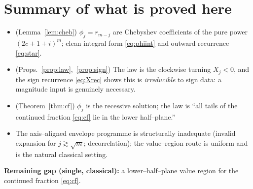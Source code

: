 \documentclass[11pt]{article}
\theoremstyle{definition}
\begin{document}
\section*{Summary of what is proved here}
\begin{itemize}
\item[\textbf{R1}] (Lemma~\ref{lem:cheb}) $\phi_j=r_{m-j}$ are Chebyshev coefficients of the
pure power $(2c+1+i)^m$; clean integral form \eqref{eq:phiint} and outward recurrence
\eqref{eq:star}.
\item[\textbf{R2}] (Props.~\ref{prop:law},~\ref{prop:sign}) The law is the clockwise turning
$X_j<0$, and the sign recurrence \eqref{eq:Xrec} shows this is \emph{irreducible} to sign
data: a magnitude input is genuinely necessary.
\item[\textbf{R3}] (Theorem~\ref{thm:cf}) $\phi_j$ is the recessive solution; the law is
``all tails of the continued fraction \eqref{eq:cf} lie in the lower half--plane.''
\item[\textbf{R4}] The axis--aligned envelope programme is structurally inadequate (invalid
expansion for $j\gtrsim\sqrt m$; decorrelation); the value--region route is uniform and is
the natural classical setting.
\end{itemize}
\noindent\textbf{Remaining gap (single, classical):} a lower--half--plane value region for
the continued fraction \eqref{eq:cf}.
\end{document}
